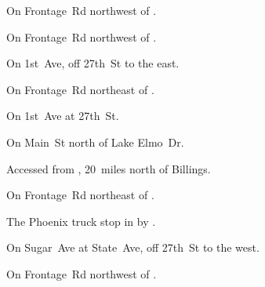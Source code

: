 

\begin{LocationList}

On Frontage~Rd northwest of  .

On Frontage~Rd northwest of  .

On 1st~Ave, off  27th~St to the east.

\Location{\GarageHQ \Garage}
On Frontage~Rd northeast of  .

On 1st~Ave at  27th~St.

On  Main~St north of Lake Elmo~Dr.

Accessed from , 20~miles north of Billings.

On Frontage~Rd northeast of  .

The Phoenix truck stop in  by  .

On Sugar~Ave at State~Ave, off  27th~St to the west.

On Frontage~Rd northwest of  .

\end{LocationList}

